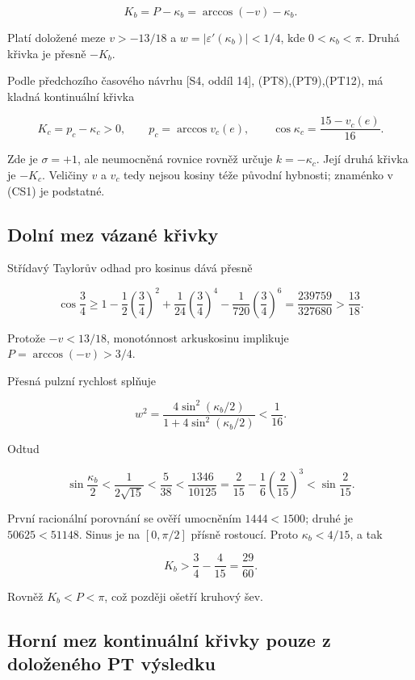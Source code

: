 \documentclass[11pt,a4paper]{article}
\theoremstyle{remark}\newtheorem{remark}[theorem]{Poznámka}
\numberwithin{equation}{section}
\begin{document}
\[
K_b=P-\kappa_b=\arccos(-v)-\kappa_b.
\tag{CS1}
\]

Platí doložené meze \(v>-13/18\) a \(w=|\varepsilon'(\kappa_b)|<1/4\),
kde \(0<\kappa_b<\pi\). Druhá křivka je přesně \(-K_b\).

Podle předchozího časového návrhu {[}S4, oddíl 14{]},
(PT8),(PT9),(PT12), má kladná kontinuální křivka

\[
K_c=p_c-\kappa_c>0,\qquad
p_c=\arccos v_c(e),\qquad
\cos\kappa_c=\frac{15-v_c(e)}{16}.
\tag{CS2}
\]

Zde je \(\sigma=+1\), ale neumocněná rovnice rovněž určuje
\(k=-\kappa_c\). Její druhá křivka je \(-K_c\). Veličiny \(v\) a \(v_c\)
tedy nejsou kosiny téže původní hybnosti; znaménko v (CS1) je
podstatné.

\hypertarget{dolnuxed-mez-vuxe1zanuxe9-kux159ivky}{%
\subsection{Dolní mez vázané
křivky}\label{dolnuxed-mez-vuxe1zanuxe9-kux159ivky}}

Střídavý Taylorův odhad pro kosinus dává přesně

\[
\cos\frac34
\ge1-\frac12\left(\frac34\right)^2
+\frac1{24}\left(\frac34\right)^4
-\frac1{720}\left(\frac34\right)^6
=\frac{239759}{327680}>\frac{13}{18}.
\tag{CS3}
\]

Protože \(-v<13/18\), monotónnost arkuskosinu implikuje
\(P=\arccos(-v)>3/4\).

Přesná pulzní rychlost splňuje

\[
w^2=\frac{4\sin^2(\kappa_b/2)}
{1+4\sin^2(\kappa_b/2)}<\frac1{16}.
\]

Odtud

\[
\sin\frac{\kappa_b}{2}<\frac1{2\sqrt{15}}
<\frac5{38}
<\frac{1346}{10125}
=\frac2{15}-\frac16\left(\frac2{15}\right)^3
<\sin\frac2{15}.
\tag{CS4}
\]

První racionální porovnání se ověří umocněním \(1444<1500\); druhé je
\(50625<51148\). Sinus je na \([0,\pi/2]\) přísně rostoucí. Proto
\(\kappa_b<4/15\), a tak

\[
\boxed{K_b>\frac34-\frac4{15}=\frac{29}{60}.}
\tag{CS5}
\]

Rovněž \(K_b<P<\pi\), což později ošetří kruhový šev.

\hypertarget{hornuxed-mez-kontinuuxe1lnuxed-kux159ivky-pouze-z-doloux17eenuxe9ho-pt-vuxfdsledku}{%
\subsection{Horní mez kontinuální křivky pouze z doloženého PT
výsledku}\label{hornuxed-mez-kontinuuxe1lnuxed-kux159ivky-pouze-z-doloux17eenuxe9ho-pt-vuxfdsledku}}
\end{document}
